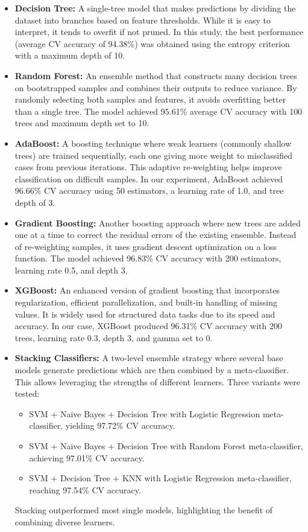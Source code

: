 \documentclass[12pt,a4paper]{article}
\begin{document}
\begin{itemize}
    \item \textbf{Decision Tree:} A single-tree model that makes predictions by dividing the dataset into branches based on feature thresholds. While it is easy to interpret, it tends to overfit if not pruned. In this study, the best performance (average CV accuracy of 94.38\%) was obtained using the entropy criterion with a maximum depth of 10.
    
    \item \textbf{Random Forest:} An ensemble method that constructs many decision trees on bootstrapped samples and combines their outputs to reduce variance. By randomly selecting both samples and features, it avoids overfitting better than a single tree. The model achieved 95.61\% average CV accuracy with 100 trees and maximum depth set to 10.
    
    \item \textbf{AdaBoost:} A boosting technique where weak learners (commonly shallow trees) are trained sequentially, each one giving more weight to misclassified cases from previous iterations. This adaptive re-weighting helps improve classification on difficult samples. In our experiment, AdaBoost achieved 96.66\% CV accuracy using 50 estimators, a learning rate of 1.0, and tree depth of 3.
    
    \item \textbf{Gradient Boosting:} Another boosting approach where new trees are added one at a time to correct the residual errors of the existing ensemble. Instead of re-weighting samples, it uses gradient descent optimization on a loss function. The model achieved 96.83\% CV accuracy with 200 estimators, learning rate 0.5, and depth 3.
    
    \item \textbf{XGBoost:} An enhanced version of gradient boosting that incorporates regularization, efficient parallelization, and built-in handling of missing values. It is widely used for structured data tasks due to its speed and accuracy. In our case, XGBoost produced 96.31\% CV accuracy with 200 trees, learning rate 0.3, depth 3, and gamma set to 0.
    
    \item \textbf{Stacking Classifiers:} A two-level ensemble strategy where several base models generate predictions which are then combined by a meta-classifier. This allows leveraging the strengths of different learners. Three variants were tested:
    \begin{itemize}
        \item SVM + Naive Bayes + Decision Tree with Logistic Regression meta-classifier, yielding 97.72\% CV accuracy.
        \item SVM + Naive Bayes + Decision Tree with Random Forest meta-classifier, achieving 97.01\% CV accuracy.
        \item SVM + Decision Tree + KNN with Logistic Regression meta-classifier, reaching 97.54\% CV accuracy.
    \end{itemize}
    Stacking outperformed most single models, highlighting the benefit of combining diverse learners.
\end{itemize}
\end{document}
